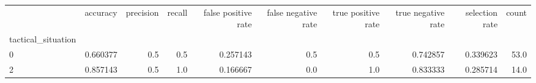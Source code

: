 \begin{tabular}{lrrrrrrrrr}
\toprule
{} &  accuracy &  precision &  recall &  false positive rate &  false negative rate &  true positive rate &  true negative rate &  selection rate &  count \\
tactical\_situation &           &            &         &                      &                      &                     &                     &                 &        \\
\midrule
0                  &  0.660377 &        0.5 &     0.5 &             0.257143 &                  0.5 &                 0.5 &            0.742857 &        0.339623 &   53.0 \\
2                  &  0.857143 &        0.5 &     1.0 &             0.166667 &                  0.0 &                 1.0 &            0.833333 &        0.285714 &   14.0 \\
\bottomrule
\end{tabular}
